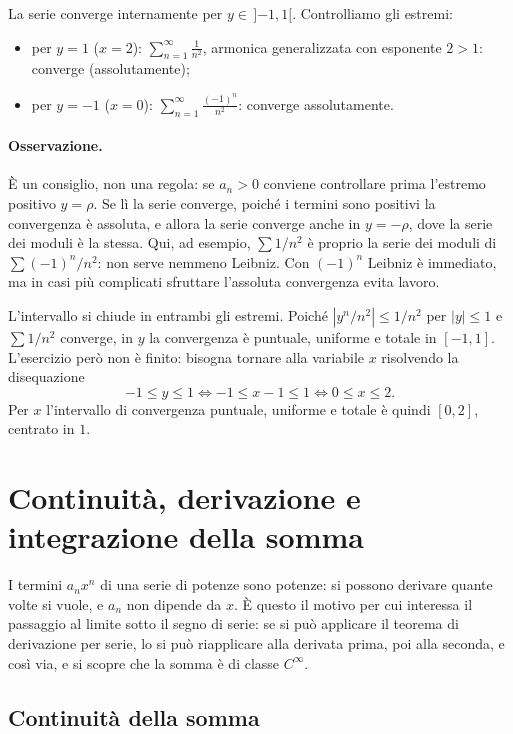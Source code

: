 La serie converge internamente per $y\in\,]{-1},1[$. Controlliamo gli estremi:
\begin{itemize}
  \item per $y=1$ ($x=2$): $\displaystyle\sum_{n=1}^{\infty} \frac{1}{n^2}$, armonica generalizzata con
        esponente $2>1$: converge (assolutamente);
  \item per $y=-1$ ($x=0$): $\displaystyle\sum_{n=1}^{\infty} \frac{(-1)^n}{n^2}$: converge assolutamente.
\end{itemize}

\paragraph{Osservazione.}
È un consiglio, non una regola: se $a_n>0$ conviene controllare prima l'estremo positivo $y=\rho$. Se lì la serie
converge, poiché i termini sono positivi la convergenza è assoluta, e allora la serie converge anche in
$y=-\rho$, dove la serie dei moduli è la stessa. Qui, ad esempio, $\sum 1/n^2$ è proprio la serie dei moduli di
$\sum (-1)^n/n^2$: non serve nemmeno Leibniz. Con $(-1)^n$ Leibniz è immediato, ma in casi più complicati sfruttare
l'assoluta convergenza evita lavoro.

L'intervallo si chiude in entrambi gli estremi. Poiché $|y^n/n^2| \le 1/n^2$ per $|y|\le 1$ e
$\sum 1/n^2$ converge, in $y$ la convergenza è puntuale, uniforme e totale in $[-1,1]$.
L'esercizio però non è finito: bisogna tornare alla variabile $x$ risolvendo la disequazione
\[
  -1 \le y \le 1 \iff -1 \le x-1 \le 1 \iff 0 \le x \le 2 .
\]
Per $x$ l'intervallo di convergenza puntuale, uniforme e totale è quindi $[0,2]$, centrato in $1$.

\section{Continuità, derivazione e integrazione della somma}

I termini $a_n x^n$ di una serie di potenze sono potenze: si possono derivare quante volte si vuole, e $a_n$ non
dipende da $x$. È questo il motivo per cui interessa il passaggio al limite sotto il segno di serie: se si può
applicare il teorema di derivazione per serie, lo si può riapplicare alla derivata prima, poi alla seconda, e
così via, e si scopre che la somma è di classe $C^\infty$.

\subsection{Continuità della somma}

